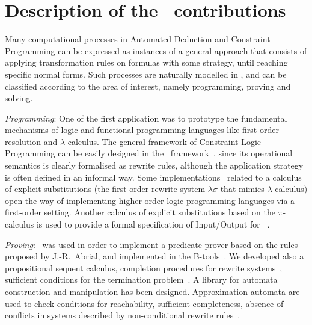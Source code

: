 

\section{Description of the \elan\ contributions}


Many computational processes in Automated Deduction and Constraint
Programming can be expressed as instances of a general approach that
consists of applying transformation rules on formulas with some strategy, 
until reaching specific normal forms. Such processes
are naturally modelled in \elan, and can be classified according to
the area of interest, namely programming, proving and solving.

\noindent
{\it Programming}:
One of the first application was to prototype the fundamental
mechanisms of logic and functional programming languages  like first-order
resolution and $\lambda$-calculus.
%
The general framework of Constraint Logic
Programming can be easily designed 
in the \elan\ framework~\cite{KirchnerR-FI98}, since its operational
semantics is clearly formalised as rewrite rules, although the
application strategy is often defined in an informal way. 
%
Some implementations~\cite{Borovansky-95} related to a 
calculus of explicit substitutions (the first-order rewrite system
$\lambda\sigma$ that mimics $\lambda$-calculus) open the way of
implementing higher-order logic programming languages via a
first-order setting. Another calculus of 
explicit substitutions based on the $\pi$-calculus is used to provide
a formal specification of Input/Output for \elan~\cite{Viry-RwLg1996}. 

\noindent
{\it Proving}:
\ELAN\ was used in order to implement a predicate prover based on the
rules proposed by J.-R.~Abrial, and implemented in the
B-tools~\cite{CirsteaKirchner97web}.
We developed also a propositional sequent calculus, completion procedures for
rewrite systems~\cite{KirchnerM-RTA95}, sufficient conditions
for the termination problem~\cite{genetgnaedig-caap97}.
A library for automata construction and manipulation has been
designed. Approximation automata are used to check conditions for
reachability, sufficient completeness, absence of conflicts in systems 
described by non-conditional rewrite rules~\cite{genet-rta98,genet-these}.

